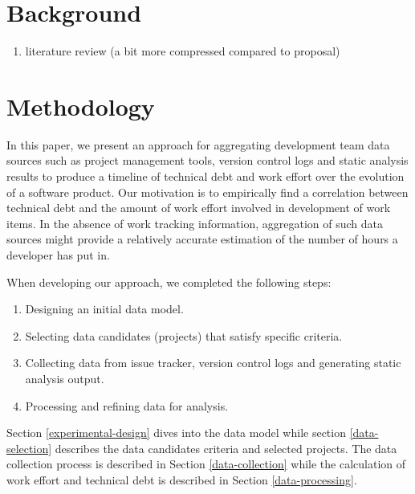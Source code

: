 \documentclass{mpaper}
\begin{document}
\section{Background}
\label{background}

\begin{enumerate}
  \item literature review (a bit more compressed compared to proposal)
\end{enumerate}

\section{Methodology}
\label{methodology}

In this paper, we present an approach for aggregating development team data
sources such as project management tools, version control logs and static
analysis results to produce a timeline of technical debt and work effort over
the evolution of a software product. Our motivation is to empirically find a
correlation between technical debt and the amount of work effort involved in
development of work items. In the absence of work tracking information,
aggregation of such data sources might provide a relatively accurate estimation
of the number of hours a developer has put in.

When developing our approach, we completed the following steps:
\begin{enumerate}
  \item Designing an initial data model.
  \item Selecting data candidates (projects) that satisfy specific criteria.
  \item Collecting data from issue tracker, version control logs and generating
  static analysis output.
  \item Processing and refining data for analysis. 
\end{enumerate}

Section \ref{experimental-design} dives into the data model while section
\ref{data-selection} describes the data candidates criteria and selected
projects. The data collection process is described in Section
\ref{data-collection} while the calculation of work effort and technical debt is
described in Section \ref{data-processing}.
\end{document}
